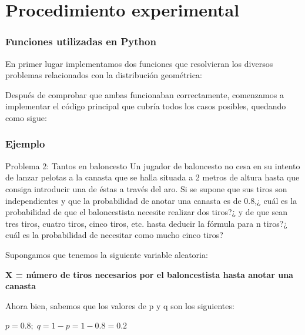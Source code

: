 \documentclass{beamer}
\begin{document}
\section {Procedimiento experimental}
\begin{frame}
\frametitle{Funciones utilizadas en Python}
En primer lugar implementamos dos funciones que resolvieran los diversos problemas relacionados con la distribución geométrica:
\begin{center}
\hyperlink{Liga1}{}
\hypertarget<2>{Liga2}{}
\end{center}

Después de comprobar que ambas funcionaban correctamente, comenzamos a implementar el código principal que cubría todos los casos posibles, quedando como sigue:
\begin{center}
\hyperlink{Liga3}{}
\hypertarget<2>{Liga4}{}
\end{center}
\end{frame}
\begin{frame}
\frametitle{Ejemplo}
\begin{block}{\color{white}Problema 2: Tantos en baloncesto}
Un jugador de baloncesto no cesa en su intento de lanzar pelotas a la canasta que se halla situada a 2 metros de altura hasta que consiga introducir una de éstas a través del aro. Si se supone que sus tiros son independientes y que la probabilidad de anotar una canasta es de 0.8,¿ cuál es la probabilidad de que el baloncestista necesite realizar dos tiros?¿ y de que sean tres tiros, cuatro tiros, cinco tiros, etc. hasta deducir la fórmula para n tiros?¿ cuál es la probabilidad de necesitar como mucho cinco tiros?
\end{block}


Supongamos que tenemos la siguiente variable aleatoria:
\begin{center}
\bf{X = número de tiros necesarios por el baloncestista hasta anotar una canasta}
\end{center}
Ahora bien, sabemos que los valores de p y q son los siguientes:
\begin{center}
{$p=0.8;\; q=1-p= 1-0.8= 0.2$}
\end{center}
\end{frame}
\end{document}
